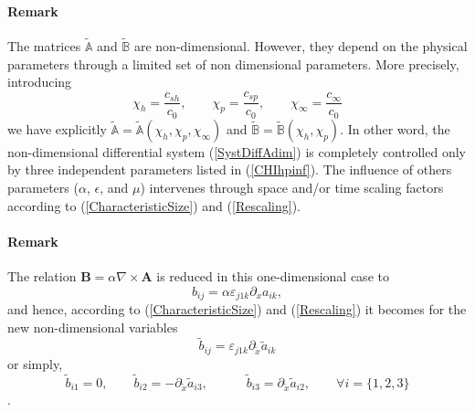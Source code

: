 \documentclass[
10pt, %
a4paper, %
oneside, %
headinclude,footinclude, %
table
]{scrartcl}
\begin{document}
\paragraph{Remark} The matrices $\tilde{\mathbb{A}}$ and $\tilde{\mathbb{B}}$ are non-dimensional. 
However, they depend on the physical parameters through a limited set of non dimensional 
parameters. More precisely, introducing
\begin{equation}\label{CHIhpinf}
\chi_{h}=\frac{c_{sh}}{c_{0}}, \quad\quad
\chi_{p}=\frac{c_{sp}}{c_{0}}, \quad\quad
\chi_{\infty}=\frac{c_{\infty}}{c_{0}}
\end{equation}
we have explicitly $\tilde{\mathbb{A}}=\tilde{\mathbb{A}}(\chi_{h},\chi_{p},\chi_{\infty})$ and 
$\tilde{\mathbb{B}}=\tilde{\mathbb{B}}(\chi_{h},\chi_{p})$. In other word, the non-dimensional 
differential system (\ref{SystDiffAdim}) is completely controlled only by three independent 
parameters listed in (\ref{CHIhpinf}). The influence of others parameters ($\alpha$, $ \epsilon $, 
and $ \mu $) 
intervenes through space and/or time scaling factors according to (\ref{CharacteristicSize}) and 
(\ref{Rescaling}). 

\paragraph{Remark} The relation $\textbf{B}=\alpha \nabla\times \textbf{A}$ is reduced in 
this one-dimensional case to 
$$
b_{ij}=\alpha \varepsilon_{j1k}\partial_{x}a_{ik},
$$
and hence, according to  (\ref{CharacteristicSize}) and (\ref{Rescaling}) it becomes for the new 
non-dimensional variables
$$
\tilde{b}_{ij}=\varepsilon_{j1k}\partial_{\tilde{x}}\tilde{a}_{ik}
$$
or simply,
\begin{equation}\label{ABrelationAdim}
\tilde{b}_{i1}=0 , \quad \quad
\tilde{b}_{i2}=
 -\partial_{\tilde{x}}\tilde{a}_{i3},
\quad\quad\quad
\tilde{b}_{i3}=
 \partial_{\tilde{x}}\tilde{a}_{i2},
 \quad\quad
 \forall i=\{1,2,3\}
\end{equation}.
\end{document}
